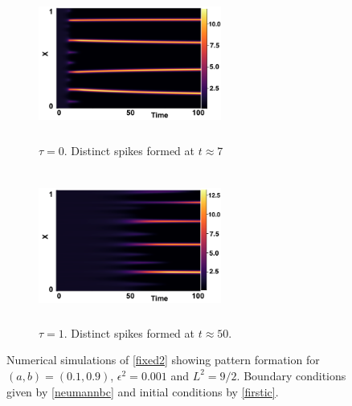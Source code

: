 \begin{figure}[H]
    \centering
    \begin{subfigure}[t]{0.45\textwidth}
        \centering
        \includegraphics[width=6cm,height = 5cm]{patt1.png}
        \caption{$\tau=0$. Distinct spikes formed at $t\approx7$ }
        \label{}
    \end{subfigure}
    \hfill
    \begin{subfigure}[t]{0.45\textwidth}
        \centering
        \includegraphics[width=6cm,height = 5cm]{patt2.png}
        \caption{$\tau=1$. Distinct spikes formed at $t\approx50$.}
        \label{}
    \end{subfigure}
    \caption{Numerical simulations of \eqref{fixed2} showing pattern formation for $(a,b)=(0.1,0.9)$, $\epsilon^2=0.001$ and $L^2=9/2$. Boundary conditions given by \eqref{neumannbc} and initial conditions by \eqref{firstic}.}
    \label{fig:fixedsim2}
\end{figure}


